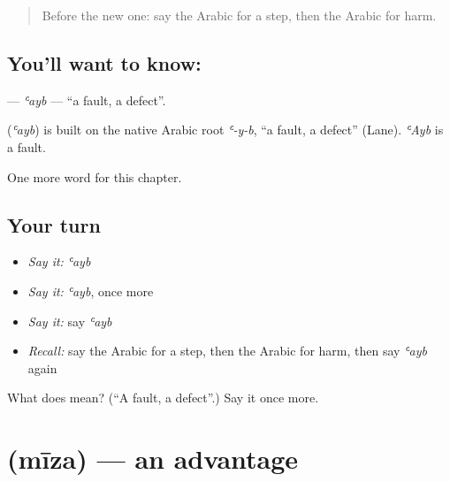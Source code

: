 \label{lesson:AR-C269-ayb}



\begin{quote}
Before the new one: say the Arabic for a step, then the Arabic for harm.
\end{quote}

\subsection*{You'll want to know: }
\textbf{} — \emph{ʿayb} — \textquotedblleft{}a fault, a defect\textquotedblright{}.

\begin{cousinweb}
\textbf{} (\emph{ʿayb}) is built on the native Arabic root \emph{ʿ-y-b}, \textquotedblleft{}a fault, a defect\textquotedblright{} (Lane). \emph{ʿAyb} is a fault.
\end{cousinweb}

\begin{grammarlens}[title={What you've built}]
One more word for this chapter.
\end{grammarlens}

\subsection*{Your turn}
\begin{itemize}
\raggedright
  \item \emph{Say it:} \emph{ʿayb}
  \item \emph{Say it:} \emph{ʿayb}, once more
  \item \emph{Say it:} say \emph{ʿayb}
  \item \emph{Recall:} say the Arabic for a step, then the Arabic for harm, then say \emph{ʿayb} again
\end{itemize}

\begin{tcolorbox}[breakable,colback=teal!4,colframe=teal!35!black,title={Before you move on}]
What does  mean? (\textquotedblleft{}A fault, a defect\textquotedblright{}.) Say it once more.
\end{tcolorbox}
\section[\texorpdfstring{\ar{ميزة} (mīza)}{ميزة (mīza)}]{ (mīza) — an advantage}

\label{lesson:AR-C269-miza}




